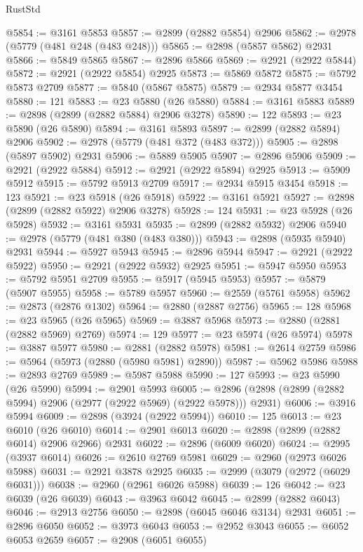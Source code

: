 \begin{lexlean}{RustStd}
\begin{coremodule}
@5854 := @3161 @5853
@5857 := @2899 (@2882 @5854) @2906
@5862 := @2978 (@5779 (@481 @248 (@483 @248)))
@5865 := @2898 (@5857 @5862) @2931
@5866 := @5849 @5865
@5867 := @2896 @5866
@5869 := @2921 (@2922 @5844)
@5872 := @2921 (@2922 @5854) @2925
@5873 := @5869 @5872
@5875 := @5792 @5873 @2709
@5877 := @5840 (@5867 @5875)
@5879 := @2934 @5877 @3454
@5880 := 121
@5883 := @23 @5880 (@26 @5880)
@5884 := @3161 @5883
@5889 := @2898 (@2899 (@2882 @5884) @2906 @3278)
@5890 := 122
@5893 := @23 @5890 (@26 @5890)
@5894 := @3161 @5893
@5897 := @2899 (@2882 @5894) @2906
@5902 := @2978 (@5779 (@481 @372 (@483 @372)))
@5905 := @2898 (@5897 @5902) @2931
@5906 := @5889 @5905
@5907 := @2896 @5906
@5909 := @2921 (@2922 @5884)
@5912 := @2921 (@2922 @5894) @2925
@5913 := @5909 @5912
@5915 := @5792 @5913 @2709
@5917 := @2934 @5915 @3454
@5918 := 123
@5921 := @23 @5918 (@26 @5918)
@5922 := @3161 @5921
@5927 := @2898 (@2899 (@2882 @5922) @2906 @3278)
@5928 := 124
@5931 := @23 @5928 (@26 @5928)
@5932 := @3161 @5931
@5935 := @2899 (@2882 @5932) @2906
@5940 := @2978 (@5779 (@481 @380 (@483 @380)))
@5943 := @2898 (@5935 @5940) @2931
@5944 := @5927 @5943
@5945 := @2896 @5944
@5947 := @2921 (@2922 @5922)
@5950 := @2921 (@2922 @5932) @2925
@5951 := @5947 @5950
@5953 := @5792 @5951 @2709
@5955 := @5917 (@5945 @5953)
@5957 := @5879 (@5907 @5955)
@5958 := @5789 @5957
@5960 := @2559 (@5761 @5958)
@5962 := @2873 (@2876 @1302)
@5964 := @2880 (@2887 @2756)
@5965 := 128
@5968 := @23 @5965 (@26 @5965)
@5969 := @3887 @5968
@5973 := @2880 (@2881 (@2882 @5969) @2769)
@5974 := 129
@5977 := @23 @5974 (@26 @5974)
@5978 := @3887 @5977
@5980 := @2881 (@2882 @5978)
@5981 := @2614 @2759
@5986 := @5964 (@5973 (@2880 (@5980 @5981) @2890))
@5987 := @5962 @5986
@5988 := @2893 @2769
@5989 := @5987 @5988
@5990 := 127
@5993 := @23 @5990 (@26 @5990)
@5994 := @2901 @5993
@6005 := @2896 (@2898 (@2899 (@2882 @5994) @2906 (@2977 (@2922 @5969) (@2922 @5978))) @2931)
@6006 := @3916 @5994
@6009 := @2898 (@3924 (@2922 @5994))
@6010 := 125
@6013 := @23 @6010 (@26 @6010)
@6014 := @2901 @6013
@6020 := @2898 (@2899 (@2882 @6014) @2906 @2966) @2931
@6022 := @2896 (@6009 @6020)
@6024 := @2995 (@3937 @6014)
@6026 := @2610 @2769 @5981
@6029 := @2960 (@2973 @6026 @5988)
@6031 := @2921 @3878 @2925
@6035 := @2999 (@3079 (@2972 (@6029 @6031)))
@6038 := @2960 (@2961 @6026 @5988)
@6039 := 126
@6042 := @23 @6039 (@26 @6039)
@6043 := @3963 @6042
@6045 := @2899 (@2882 @6043)
@6046 := @2913 @2756
@6050 := @2898 (@6045 @6046 @3134) @2931
@6051 := @2896 @6050
@6052 := @3973 @6043
@6053 := @2952 @3043
@6055 := @6052 @6053 @2659
@6057 := @2908 (@6051 @6055)

\end{coremodule}
\end{lexlean}

